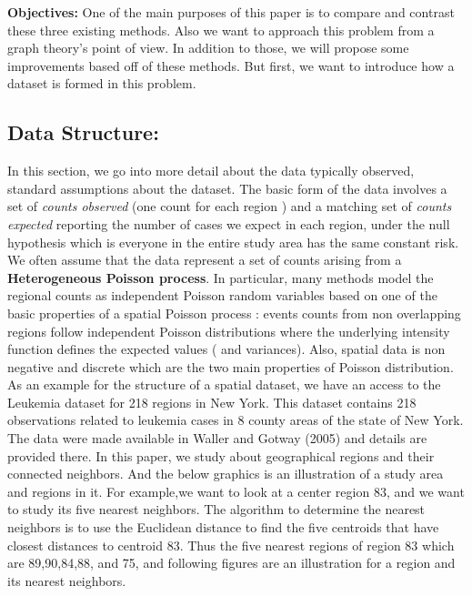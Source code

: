\documentclass[12pt]{article}
\begin{document}
			\textbf{Objectives:} One of the main purposes of this paper is to compare and contrast these three existing methods. Also we want to approach this problem from a graph theory's point of view. In addition to those, we will propose some improvements based off of these methods. But first, we want to introduce how a dataset is formed in this problem. \\
				
		\subsection{Data Structure:} 
			In this section, we go into more detail about the data typically observed, standard assumptions about the dataset. 
			The basic form of the data involves a set of \textit{counts observed} (one count for each region ) and a matching set of \textit{counts expected} reporting the number of cases we expect in each region, under the null hypothesis which is everyone in the entire study area has the same constant risk. \\
			
We often assume that the data represent a set of counts arising from a \textbf{Heterogeneous Poisson process}.
In particular, many methods model the regional counts as independent Poisson random variables based on one of the basic properties of a spatial Poisson process : events counts from non overlapping regions follow independent Poisson distributions where the underlying intensity function defines the expected values ( and variances). Also, spatial data is non negative and discrete which are the two main properties of Poisson distribution. \\
			 
			
			
			As an example for the structure of a spatial dataset, we have an access to the Leukemia dataset for 218 regions in New York. This dataset contains 218 observations related to leukemia cases in 8 county areas of the state of New York. The data were made available in Waller and Gotway (2005) and details are provided there. In this paper, we study about geographical regions and their connected neighbors. And 			
the below graphics is an illustration of a study area and regions in it. For example,we want to look at a center region 83, and we want to study its five nearest neighbors. The algorithm to determine the nearest neighbors is to use the Euclidean distance to find the five centroids that have closest distances to centroid 83. Thus the five nearest regions of region 83 which are 89,90,84,88, and 75, and following figures are an illustration for a region and its nearest neighbors. \\	
			
\end{document}
